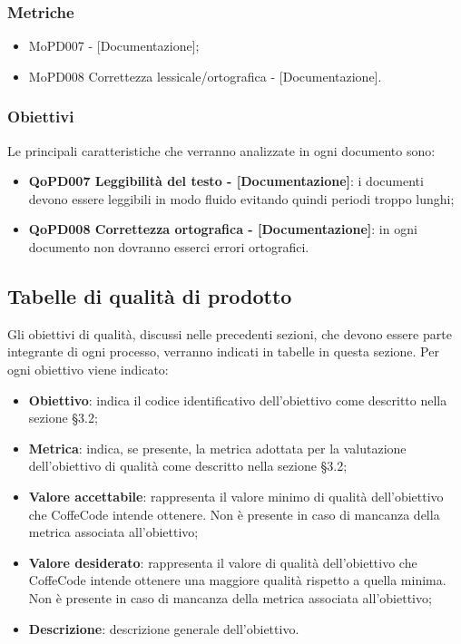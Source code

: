 \documentclass[../piano-di-qualifica.tex]{subfiles}
\begin{document}
\subsubsection{Metriche}
\label{sub:metriche}
\begin{itemize}
    \item MoPD007  - [Documentazione];
    \item MoPD008 Correttezza lessicale/ortografica - [Documentazione].
\end{itemize}

\subsubsection{Obiettivi}
\label{sub:obiettivi}
Le principali caratteristiche che verranno analizzate in ogni documento sono:
\begin{itemize}
    \item \textbf{QoPD007 Leggibilità del testo - [Documentazione]}: i documenti devono essere leggibili in modo fluido evitando quindi periodi troppo lunghi;
    \item \textbf{QoPD008 Correttezza ortografica - [Documentazione]}: in ogni documento non dovranno esserci errori ortografici.
\end{itemize}

\subsection{Tabelle di qualità di prodotto}
\label{sub:tabelle_di_qualita_di_prodotto}
Gli obiettivi di qualità, discussi nelle precedenti sezioni, che devono essere parte integrante di ogni processo, verranno indicati in tabelle in questa sezione.
Per ogni obiettivo viene indicato:

\begin{itemize}
   \item \textbf{Obiettivo}: indica il codice identificativo dell'obiettivo come descritto nella sezione §3.2;
   \item \textbf{Metrica}: indica, se presente, la metrica adottata per la valutazione dell'obiettivo di qualità come descritto nella sezione §3.2;
   \item \textbf{Valore accettabile}: rappresenta il valore minimo di qualità dell'obiettivo che CoffeCode intende ottenere. Non è presente in caso di mancanza della metrica associata all'obiettivo;
   \item \textbf{Valore desiderato}: rappresenta il valore di qualità dell'obiettivo che CoffeCode intende ottenere una maggiore qualità rispetto a quella minima. Non è presente in caso di mancanza della metrica associata all'obiettivo;
   \item \textbf{Descrizione}: descrizione generale dell'obiettivo.
\end{itemize}
\end{document}
